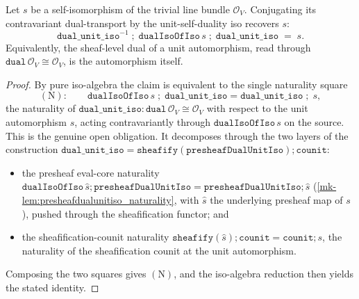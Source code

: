\begin{lemma}\label{mk-lem:dualunitiso_dualisoofiso}
  \leanok

  Let \(s\) be a self-isomorphism of the trivial line bundle \(\mathcal O_V\). Conjugating its
  contravariant dual-transport by the unit-self-duality iso recovers \(s\):
  \[
    \mathtt{dual\_unit\_iso}^{-1}
      \;\mathbin{;}\; \mathtt{dualIsoOfIso}\,s
      \;\mathbin{;}\; \mathtt{dual\_unit\_iso}
    \;=\; s .
  \]
  Equivalently, the sheaf-level dual of a unit automorphism, read through
  \(\mathtt{dual}\,\mathcal O_V \cong \mathcal O_V\), is the automorphism itself.
\end{lemma}
\begin{proof}
  \leanok
  By pure iso-algebra the claim is equivalent to the single naturality square
  \[
    (\mathrm N):\qquad
    \mathtt{dualIsoOfIso}\,s \;\mathbin{;}\; \mathtt{dual\_unit\_iso}
      = \mathtt{dual\_unit\_iso} \;\mathbin{;}\; s,
  \]
  the naturality of \(\mathtt{dual\_unit\_iso} : \mathtt{dual}\,\mathcal O_V \cong \mathcal O_V\) with
  respect to the unit automorphism \(s\), acting contravariantly through \(\mathtt{dualIsoOfIso}\,s\)
  on the source. This is the genuine open obligation. It decomposes through the two layers of the
  construction \(\mathtt{dual\_unit\_iso} = \mathtt{sheafify}(\mathtt{presheafDualUnitIso})
  \mathbin{;} \mathtt{counit}\):
  \begin{itemize}
    \item the presheaf eval-core naturality
      \(\mathtt{dualIsoOfIso}\,\hat s \mathbin{;} \mathtt{presheafDualUnitIso}
        = \mathtt{presheafDualUnitIso} \mathbin{;} \hat s\)
      (\ref{mk-lem:presheafdualunitiso_naturality}, with \(\hat s\) the underlying presheaf map of
      \(s\)), pushed through the sheafification functor; and
    \item the sheafification-counit naturality
      \(\mathtt{sheafify}(\hat s) \mathbin{;} \mathtt{counit} = \mathtt{counit} \mathbin{;} s\),
      the naturality of the sheafification counit at the unit automorphism.
  \end{itemize}
  Composing the two squares gives \((\mathrm N)\), and the iso-algebra reduction then yields the
  stated identity.
\end{proof}

